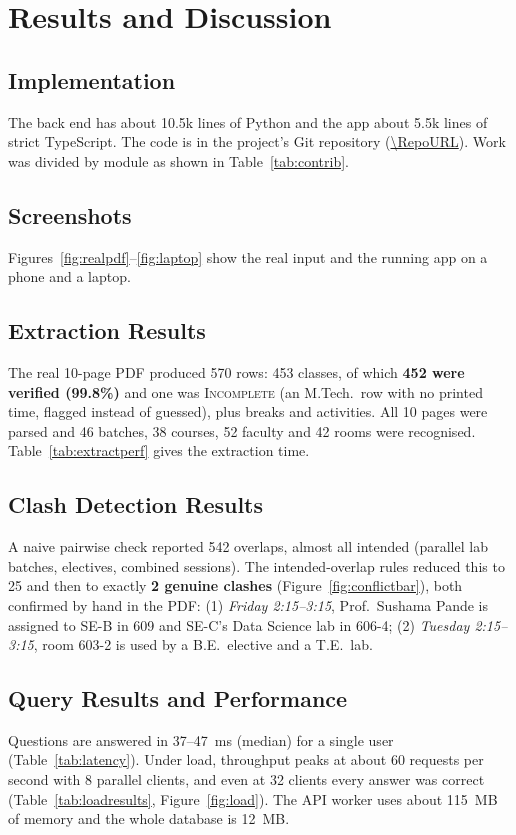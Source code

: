 \section{Results and Discussion}

\subsection{Implementation}
The back end has about 10.5k lines of Python and the app about 5.5k lines of strict TypeScript. The
code is in the project's Git repository (\url{\RepoURL}). Work was divided by module as shown in
Table~\ref{tab:contrib}.


\subsection{Screenshots}
Figures~\ref{fig:realpdf}--\ref{fig:laptop} show the real input and the running app on a phone and a
laptop.


\subsection{Extraction Results}
The real 10-page PDF produced 570 rows: 453 classes, of which \textbf{452 were verified (99.8\%)} and
one was \textsc{Incomplete} (an M.Tech.\ row with no printed time, flagged instead of guessed), plus
breaks and activities. All 10 pages were parsed and 46 batches, 38 courses, 52 faculty and 42 rooms
were recognised. Table~\ref{tab:extractperf} gives the extraction time.


\subsection{Clash Detection Results}
A naive pairwise check reported 542 overlaps, almost all intended (parallel lab batches, electives,
combined sessions). The intended-overlap rules reduced this to 25 and then to exactly \textbf{2
genuine clashes} (Figure~\ref{fig:conflictbar}), both confirmed by hand in the PDF:
(1) \emph{Friday 2:15--3:15}, Prof.\ Sushama Pande is assigned to SE-B in 609 and SE-C's Data Science
lab in 606-4; (2) \emph{Tuesday 2:15--3:15}, room 603-2 is used by a B.E.\ elective and a T.E.\ lab.


\subsection{Query Results and Performance}
Questions are answered in 37--47~ms (median) for a single user (Table~\ref{tab:latency}). Under load,
throughput peaks at about 60 requests per second with 8 parallel clients, and even at 32 clients every
answer was correct (Table~\ref{tab:loadresults}, Figure~\ref{fig:load}). The API worker uses about
115~MB of memory and the whole database is 12~MB.




